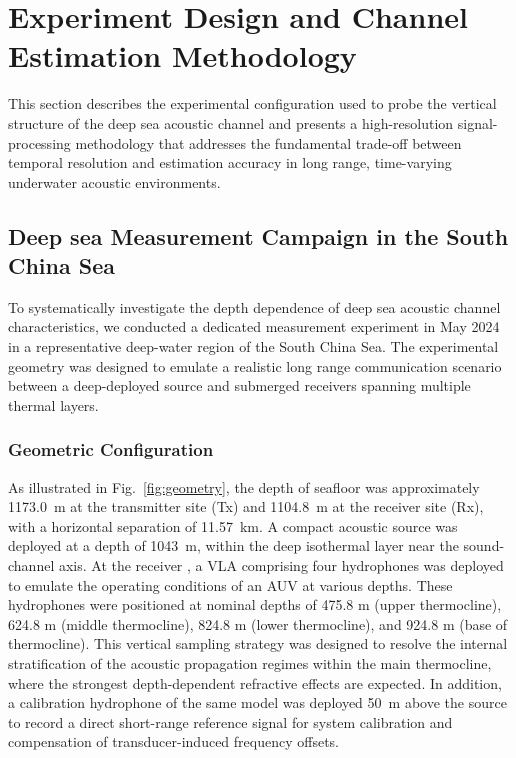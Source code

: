 \documentclass[lettersize,journal]{IEEEtran}
\begin{document}
\section{Experiment Design and Channel Estimation Methodology}
\label{sec:methodology}

This section describes the experimental configuration used to probe the vertical structure of the deep sea acoustic channel and presents a high-resolution signal-processing methodology that addresses the fundamental trade-off between temporal resolution and estimation accuracy in long range, time-varying underwater acoustic environments.

\subsection{Deep sea Measurement Campaign in the South China Sea}

To systematically investigate the depth dependence of deep sea acoustic channel characteristics, we conducted a dedicated measurement experiment in May 2024 in a representative deep-water region of the South China Sea. The experimental geometry was designed to emulate a realistic long range communication scenario between a deep-deployed source and submerged receivers spanning multiple thermal layers.

\subsubsection{Geometric Configuration}

As illustrated in Fig.~\ref{fig:geometry}, the depth of seafloor was approximately 1173.0~m at the transmitter site (Tx) and 1104.8~m at the receiver site (Rx), with a horizontal separation of 11.57~km. A compact acoustic source was deployed at a depth of 1043~m, within the deep isothermal layer near the sound-channel axis. At the receiver , a VLA comprising four hydrophones was deployed to emulate the operating conditions of an AUV at various depths. These hydrophones were positioned at nominal depths of 475.8 m (upper thermocline), 624.8 m (middle thermocline), 824.8 m (lower thermocline), and 924.8 m (base of thermocline). This vertical sampling strategy was designed to resolve the internal stratification of the acoustic propagation regimes within the main thermocline, where the strongest depth-dependent refractive effects are expected. In addition, a calibration hydrophone of the same model was deployed 50~m above the source to record a direct short-range reference signal for system calibration and compensation of transducer-induced frequency offsets.
\end{document}
